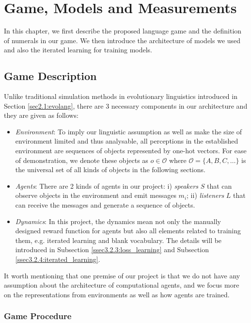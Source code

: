 \chapter{Game, Models and Measurements}
\label{ch3:game_model}

In this chapter, we first describe the proposed language game and the definition of numerals in our game. We then introduce the architecture of models we used and also the iterated learning for training models.

\section{Game Description}
\label{sec3.1:game_description}

Unlike traditional simulation methods in evolutionary linguistics introduced in Section \ref{sec2.1:evolang}, there are 3 necessary components in our architecture and they are given as follows:

\begin{itemize}
  \item \textit{Environment}: To imply our linguistic assumption as well as make the size of environment limited and thus analysable, all perceptions in the established environment are sequences of objects represented by one-hot vectors. For ease of demonstration, we denote these objects as $o \in \mathcal{O}$ where $\mathcal{O} = \{A, B, C, \dots\}$ is the universal set of all kinds of objects in the following sections.
  \item \textit{Agents}: There are 2 kinds of agents in our project: i) \textit{speakers} $S$ that can observe objects in the environment and emit messages $m_i$; ii) \textit{listeners} $L$ that can receive the messages and generate a sequence of objects.
  \item \textit{Dynamics}: In this project, the dynamics mean not only the manually designed reward function for agents but also all elements related to training them, e.g. iterated learning and blank vocabulary. The details will be introduced in Subsection \ref{ssec3.2.3:loss_learning} and Subsection \ref{ssec3.2.4:iterated_learning}. 
\end{itemize}

It worth mentioning that one premise of our project is that we do not have any assumption about the architecture of computational agents, and we focus more on the representations from environments as well as how agents are trained.

\subsection{Game Procedure}
\label{ssec3.1.1:game_procedure}

